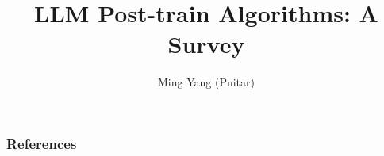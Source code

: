 \documentclass[notheorems, aspectratio=54]{beamer}
\title{LLM Post-train Algorithms: A Survey}
\author{Ming Yang (Puitar)}
\institute[Fudan University]{yangm24@m.fudan.edu.cn}
\begin{document}
\begin{frame}
    \titlepage
\end{frame}



\begin{frame}
    \frametitle{References}
    
    
\end{frame}
\end{document}
